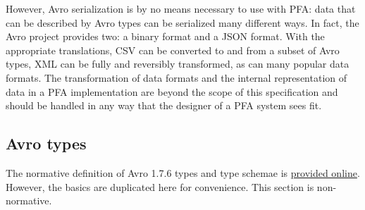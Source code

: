 \documentclass{article}
\theoremstyle{definition}
\begin{document}
However, Avro serialization is by no means necessary to use with PFA: data that can be described by Avro types can be serialized many different ways.  In fact, the Avro project provides two: a binary format and a JSON format.  With the appropriate translations, CSV can be converted to and from a subset of Avro types, XML can be fully and reversibly transformed, as can many popular data formats.  The transformation of data formats and the internal representation of data in a PFA implementation are beyond the scope of this specification and should be handled in any way that the designer of a PFA system sees fit.

\hypertarget{hsec:avro-types}{}
\subsection{Avro types}
\label{sec:avro-types}

The normative definition of Avro 1.7.6 types and type schemae is \href{http://avro.apache.org/docs/1.7.6/spec.html}{provided online}.  However, the basics are duplicated here for convenience.  This section is non-normative.
\end{document}
